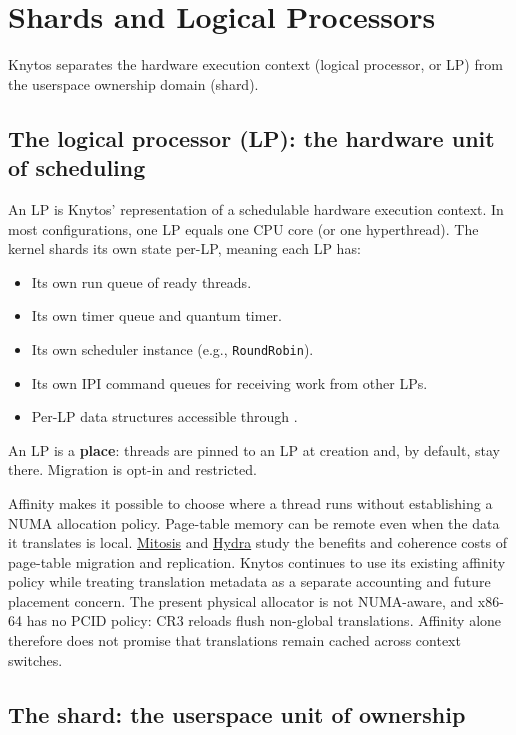 \chapter{Shards and Logical Processors}
\label{chap:shards-and-lps}

Knytos separates the hardware execution context (logical processor, or LP)
from the userspace ownership domain (shard).

\section{The logical processor (LP): the hardware unit of scheduling}

An LP is Knytos' representation of a schedulable hardware execution
context. In most configurations, one LP equals one CPU core (or one hyperthread).
The kernel shards its own state per-LP, meaning each LP has:

\begin{itemize}
    \item Its own run queue of ready threads.
    \item Its own timer queue and quantum timer.
    \item Its own scheduler instance (e.g., \texttt{RoundRobin}).
    \item Its own IPI command queues for receiving work from other LPs.
    \item Per-LP data structures accessible through .
\end{itemize}

An LP is a \textbf{place}: threads are pinned to an LP at creation and, by default,
stay there. Migration is opt-in and restricted.

Affinity makes it possible to choose where a thread runs without establishing a
NUMA allocation policy. Page-table memory can be remote even when the data
it translates is local. \href{https://arxiv.org/abs/1910.05398}{Mitosis} and
\href{https://www.usenix.org/conference/atc24/presentation/gao-bin-scalable}{Hydra}
study the benefits and coherence costs of page-table migration and replication.
Knytos continues to use its existing affinity policy while treating translation
metadata as a separate accounting and future placement concern. The present
physical allocator is not NUMA-aware, and x86-64 has no PCID policy: CR3
reloads flush non-global translations. Affinity alone therefore does not
promise that translations remain cached across context switches.

\section{The shard: the userspace unit of ownership}

